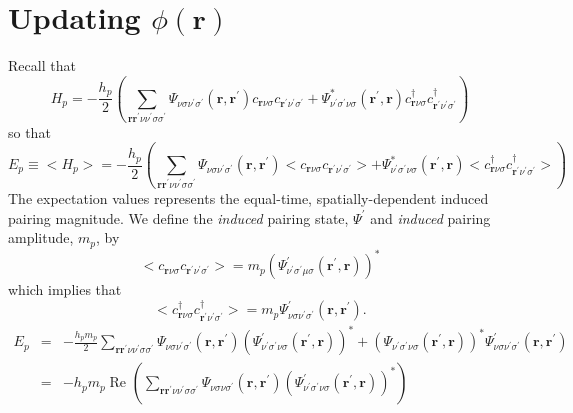 \section{Updating $\phi(\mathbf{r})$}

Recall that
\begin{equation}
H_{p}  = -\frac{h_p}{2} 
\left( \sum_{\mathbf{r}\mathbf{r}^{\prime}
\nu\nu^{\prime}\sigma\sigma^{\prime}}  
\Psi_{\nu\sigma\nu^{\prime}\sigma^{\prime}}(\mathbf{r},\mathbf{r}^{\prime})
 c_{\mathbf{r}\nu\sigma}c_{\mathbf{r}^{\prime}\nu^{\prime}\sigma^{\prime}} + 
\Psi_{\nu^{\prime}\sigma^{\prime}\nu\sigma}^*(\mathbf{r}^{\prime},\mathbf{r})
c^{\dagger}_{\mathbf{r}\nu\sigma}
 c^{\dagger}_{\mathbf{r}^{\prime}\nu^{\prime}\sigma^{\prime}}\right)
\end{equation}
so that
\begin{equation}
E_p \equiv <H_p> 
= -\frac{h_p}{2} 
\left( \sum_{\mathbf{r}\mathbf{r}^{\prime}\nu\nu^{\prime}\sigma\sigma^{\prime}}  
\Psi_{\nu\sigma\nu^{\prime}\sigma^{\prime}}(\mathbf{r},\mathbf{r}^{\prime})
<c_{\mathbf{r}\nu\sigma}c_{\mathbf{r}^{\prime}\nu^{\prime}\sigma^{\prime}}> + 
\Psi_{\nu^{\prime}\sigma^{\prime}\nu\sigma}^*(\mathbf{r}^{\prime},\mathbf{r})
 <c^{\dagger}_{\mathbf{r}\nu\sigma}
 c^{\dagger}_{\mathbf{r}^{\prime}\nu^{\prime}\sigma^{\prime}}>\right)
\end{equation}
The expectation values represents the
equal-time, spatially-dependent
induced pairing magnitude.
We define the \textit{induced} pairing state, $\Psi^{\prime}$
and \textit{induced} pairing amplitude, $m_p $, by
\begin{equation}
<c_{\mathbf{r}\nu\sigma}c_{\mathbf{r}^{\prime}\nu^{\prime}\sigma^{\prime}}>  =  m_p 
\left(\Psi^{\prime}_{\nu^{\prime}\sigma^{\prime}\mu\sigma}(\mathbf{r}^{\prime},
\mathbf{r})\right)^* 
\end{equation}
which implies that
\begin{equation}
<c^{\dagger}_{\mathbf{r}\nu\sigma} 
c^{\dagger}_{\mathbf{r}^{\prime}\nu^{\prime}\sigma^{\prime}}>  = 
m_p \Psi^{\prime}_{\nu\sigma\nu^{\prime}\sigma^{\prime}}(\mathbf{r},\mathbf{r}^{\prime}).
\end{equation}
\begin{eqnarray}
E_p & =  & - \frac{h_p m_p}{2} 
\sum_{\mathbf{r}\mathbf{r}^{\prime}\nu\nu^{\prime}\sigma\sigma^{\prime}} 
\Psi_{\nu\sigma\nu^{\prime}\sigma^{\prime}}(\mathbf{r},\mathbf{r}^{\prime}) 
\left(\Psi^{\prime}_{\nu^{\prime}\sigma^{\prime}\nu\sigma}
(\mathbf{r}^{\prime},\mathbf{r})\right)^* +
\left(\Psi_{\nu^{\prime}\sigma^{\prime}\nu\sigma}(\mathbf{r}^{\prime},
\mathbf{r})\right)^* 
\Psi^{\prime}_{\nu\sigma\nu^{\prime}\sigma^{\prime}}(\mathbf{r},\mathbf{r}^{\prime})
\\
& = &
- h_p m_p \;\textrm{Re }
\left(\sum_{\mathbf{r}\mathbf{r}^{\prime}\nu\nu^{\prime}\sigma\sigma^{\prime}} 
\Psi_{\nu\sigma\nu\sigma^{\prime}}(\mathbf{r},\mathbf{r}^{\prime}) 
\left(\Psi^{\prime}_{\nu^{\prime}\sigma^{\prime}\nu\sigma}
(\mathbf{r}^{\prime},\mathbf{r})\right)^* \right)  
\end{eqnarray} 
